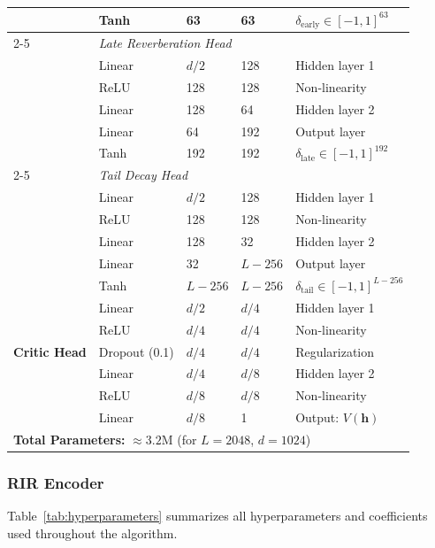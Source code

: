 \begin{table}[htbp]
\begin{tabular}{@{}llllp{4cm}@{}}
& Tanh & 63 & 63 & $\delta_{\text{early}} \in [-1, 1]^{63}$ \\
\cmidrule(lr){2-5}
& \multicolumn{4}{l}{\textit{Late Reverberation Head}} \\
& Linear & $d/2$ & 128 & Hidden layer 1 \\
& ReLU & 128 & 128 & Non-linearity \\
& Linear & 128 & 64 & Hidden layer 2 \\
& Linear & 64 & 192 & Output layer \\
& Tanh & 192 & 192 & $\delta_{\text{late}} \in [-1, 1]^{192}$ \\
\cmidrule(lr){2-5}
& \multicolumn{4}{l}{\textit{Tail Decay Head}} \\
& Linear & $d/2$ & 128 & Hidden layer 1 \\
& ReLU & 128 & 128 & Non-linearity \\
& Linear & 128 & 32 & Hidden layer 2 \\
& Linear & 32 & $L-256$ & Output layer \\
& Tanh & $L-256$ & $L-256$ & $\delta_{\text{tail}} \in [-1, 1]^{L-256}$ \\
\midrule
\multirow{5}{*}{\textbf{Critic Head}} 
& Linear & $d/2$ & $d/4$ & Hidden layer 1 \\
& ReLU & $d/4$ & $d/4$ & Non-linearity \\
& Dropout (0.1) & $d/4$ & $d/4$ & Regularization \\
& Linear & $d/4$ & $d/8$ & Hidden layer 2 \\
& ReLU & $d/8$ & $d/8$ & Non-linearity \\
& Linear & $d/8$ & 1 & Output: $V(\mathbf{h})$ \\
\midrule
\multicolumn{5}{l}{\textbf{Total Parameters:} $\approx 3.2$M (for $L=2048$, $d=1024$)} \\
\bottomrule
\end{tabular}
\end{table}

\subsubsection{RIR Encoder}

Table~\ref{tab:hyperparameters} summarizes all hyperparameters and coefficients used throughout the algorithm.

